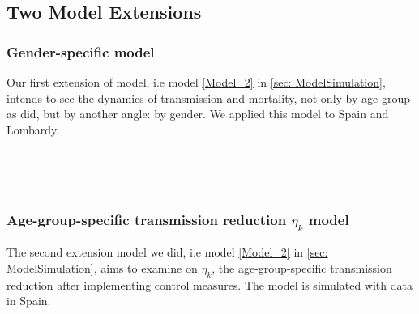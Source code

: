 \documentclass[../main.tex]{subfiles}
\begin{document}
\subsection{Two Model Extensions}

\subsubsection{Gender-specific model}

Our first extension of model, i.e model \ref{Model_2} in \ref{sec: ModelSimulation}, intends to see the dynamics of transmission and mortality, not only by age group as \cite{the original work} did, but by another angle: by gender. We applied this model to Spain and Lombardy.\\ 


\\


\\

\subsubsection{Age-group-specific transmission reduction $\eta_k$ model}

The second extension model we did, i.e model \ref{Model_2} in \ref{sec: ModelSimulation}, aims to examine on $\eta_k$, the age-group-specific transmission reduction after implementing control measures. The model is simulated with data in Spain. 
\end{document}
